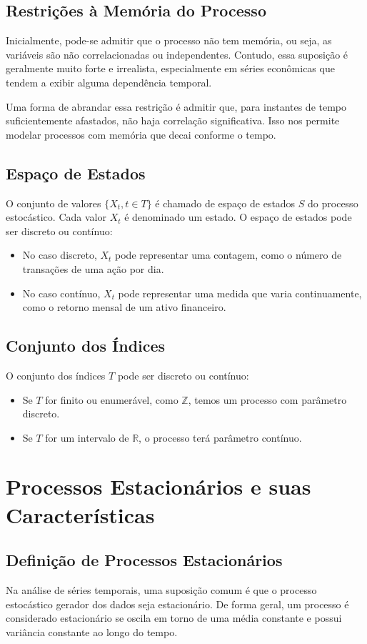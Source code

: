 \documentclass{sciposter}
\begin{document}
\begin{multicols}{3}
\subsection{Restrições à Memória do Processo}
Inicialmente, pode-se admitir que o processo não tem memória, ou seja, as variáveis são não correlacionadas ou independentes. Contudo, essa suposição é geralmente muito forte e irrealista, especialmente em séries econômicas que tendem a exibir alguma dependência temporal.

Uma forma de abrandar essa restrição é admitir que, para instantes de tempo suficientemente afastados, não haja correlação significativa. Isso nos permite modelar processos com memória que decai conforme o tempo.

\subsection{Espaço de Estados}
O conjunto de valores $\{ X_t, t \in T \}$ é chamado de espaço de estados $S$ do processo estocástico. Cada valor $X_t$ é denominado um estado. O espaço de estados pode ser discreto ou contínuo:
\begin{itemize}
    \item No caso discreto, $X_t$ pode representar uma contagem, como o número de transações de uma ação por dia.
    \item No caso contínuo, $X_t$ pode representar uma medida que varia continuamente, como o retorno mensal de um ativo financeiro.
\end{itemize}

\subsection{Conjunto dos Índices}
O conjunto dos índices $T$ pode ser discreto ou contínuo:
\begin{itemize}
    \item Se $T$ for finito ou enumerável, como $\mathbb{Z}$, temos um processo com parâmetro discreto.
    \item Se $T$ for um intervalo de $\mathbb{R}$, o processo terá parâmetro contínuo.
\end{itemize}

\section{\textbf{Processos Estacionários e suas Características}}

\subsection{Definição de Processos Estacionários}
Na análise de séries temporais, uma suposição comum é que o processo estocástico gerador dos dados seja estacionário. De forma geral, um processo é considerado estacionário se oscila em torno de uma média constante e possui variância constante ao longo do tempo.


\end{multicols}
\end{document}
